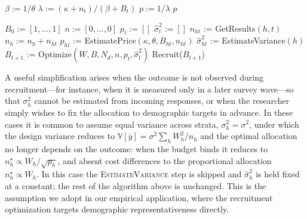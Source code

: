 \begin{algorithm}
\caption{Optimizing Stratified Recruitment with Unknown Costs and Variances}
\begin{algorithmic}
 
\State $\beta := 1 / \theta$ 
\State $\lambda := (\kappa + n_t) / (\beta + B_t)$ 
\State $p := 1 / \lambda$ 
\State \Return $p$ 
\EndProcedure

\State $B_0 := [1,...,1]$ 
\State $n := [0,...,0]$ 
 
  \State $p_t := []$ 
  \State $\hat\sigma^2_t := []$ 
   
    \State $n_{ht}$ := GetResults$(h, t)$ 
    \State $n_h := n_h + n_{ht}$ 
    \State $p_{ht}$ := EstimatePrice$(\kappa, \theta, B_{ht}, n_{ht})$ 
    \State $\hat\sigma^2_{ht}$ := EstimateVariance$(h)$ 
  \EndFor
  \State $B_{t+1}$ := Optimize$(W, B, N_d, n, p_t, \hat\sigma^2_t)$ 
  \State Recruit($B_{t+1}$) 
\EndFor
\EndProcedure
\end{algorithmic}
\end{algorithm}

A useful simplification arises when the outcome is not observed during recruitment---for instance, when it is measured only in a later survey wave---so that $\sigma_h^2$ cannot be estimated from incoming responses, or when the researcher simply wishes to fix the allocation to demographic targets in advance. In these cases it is common to assume equal variance across strata, $\sigma_h^2 = \sigma^2$, under which the design variance reduces to $\mathbb{V}[\bar{y}] = \sigma^2 \sum_h W_h^2/n_h$ and the optimal allocation no longer depends on the outcome: when the budget binds it reduces to $n_h^\star \propto W_h/\sqrt{p_h}$, and absent cost differences to the proportional allocation $n_h^\star \propto W_h$. In this case the \textsc{EstimateVariance} step is skipped and $\hat\sigma^2_h$ is held fixed at a constant; the rest of the algorithm above is unchanged. This is the assumption we adopt in our empirical application, where the recruitment optimization targets demographic representativeness directly.


